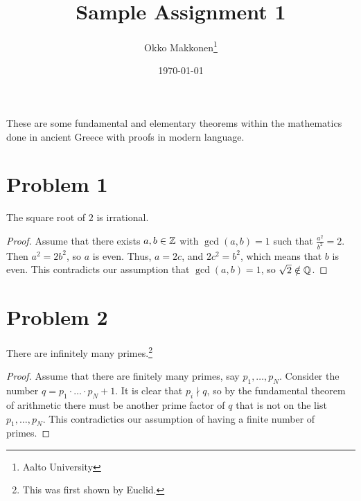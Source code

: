 \documentclass{myassignment}
\title{Sample Assignment 1}
\author{Okko Makkonen\thanks{Aalto University}}
\date{\today}
\begin{document}
\maketitle

These are some fundamental and elementary theorems within the mathematics done in ancient Greece with proofs in modern language.
    
\section{Problem 1}

\begin{theorem}
\end{theorem}

\begin{claim}
The square root of $2$ is irrational.
\end{claim}

\begin{proof}
Assume that there exists $a, b \in \mathbb{Z}$ with $\gcd(a, b) = 1$ such that $\frac{a^2}{b^2} = 2$. Then $a^2 = 2b^2$, so $a$ is even. Thus, $a = 2c$, and $2c^2 = b^2$, which means that $b$ is even. This contradicts our assumption that $\gcd(a, b) = 1$, so $\sqrt{2} \notin \mathbb{Q}$.
\end{proof}

\section{Problem 2}

\begin{claim}
There are infinitely many primes.\footnote{This was first shown by Euclid.}
\end{claim}

\begin{proof}
Assume that there are finitely many primes, say $p_1, \dots, p_N$. Consider the number $q = p_1 \cdot \ldots \cdot p_N + 1$. It is clear that $p_i \nmid q$, so by the fundamental theorem of arithmetic there must be another prime factor of $q$ that is not on the list $p_1, \dots, p_N$. This contradictics our assumption of having a finite number of primes.
\end{proof}
\end{document}
